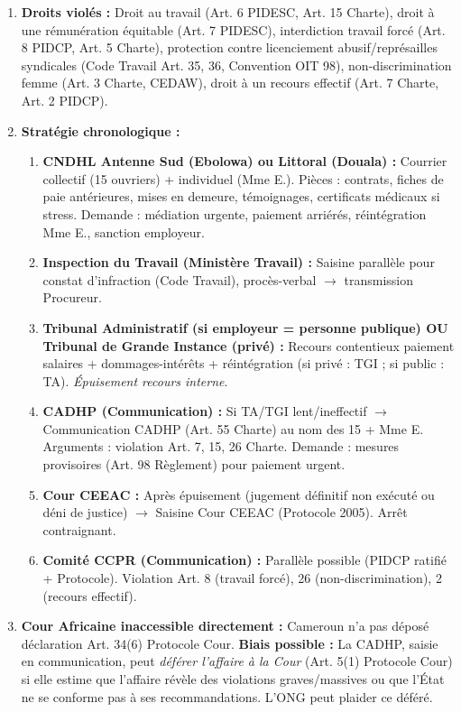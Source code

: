 \documentclass[11pt]{article}
\begin{document}
\begin{corrige}
\begin{enumerate}
  \item \textbf{Droits violés :} Droit au travail (Art. 6 PIDESC, Art. 15 Charte), droit à une rémunération équitable (Art. 7 PIDESC), interdiction travail forcé (Art. 8 PIDCP, Art. 5 Charte), protection contre licenciement abusif/représailles syndicales (Code Travail Art. 35, 36, Convention OIT 98), non-discrimination femme (Art. 3 Charte, CEDAW), droit à un recours effectif (Art. 7 Charte, Art. 2 PIDCP).
  \item \textbf{Stratégie chronologique :}
    \begin{enumerate}
      \item \textbf{CNDHL Antenne Sud (Ebolowa) ou Littoral (Douala) :} Courrier collectif (15 ouvriers) + individuel (Mme E.). Pièces : contrats, fiches de paie antérieures, mises en demeure, témoignages, certificats médicaux si stress. Demande : médiation urgente, paiement arriérés, réintégration Mme E., sanction employeur.
      \item \textbf{Inspection du Travail (Ministère Travail) :} Saisine parallèle pour constat d'infraction (Code Travail), procès-verbal $\to$ transmission Procureur.
      \item \textbf{Tribunal Administratif (si employeur = personne publique) OU Tribunal de Grande Instance (privé) :} Recours contentieux paiement salaires + dommages-intérêts + réintégration (si privé : TGI ; si public : TA). \emph{Épuisement recours interne}.
      \item \textbf{CADHP (Communication) :} Si TA/TGI lent/ineffectif $\to$ Communication CADHP (Art. 55 Charte) au nom des 15 + Mme E. Arguments : violation Art. 7, 15, 26 Charte. Demande : mesures provisoires (Art. 98 Règlement) pour paiement urgent.
      \item \textbf{Cour CEEAC :} Après épuisement (jugement définitif non exécuté ou déni de justice) $\to$ Saisine Cour CEEAC (Protocole 2005). Arrêt contraignant.
      \item \textbf{Comité CCPR (Communication) :} Parallèle possible (PIDCP ratifié + Protocole). Violation Art. 8 (travail forcé), 26 (non-discrimination), 2 (recours effectif).
    \end{enumerate}
  \item \textbf{Cour Africaine inaccessible directement :} Cameroun n'a pas déposé déclaration Art. 34(6) Protocole Cour. \textbf{Biais possible :} La CADHP, saisie en communication, peut \emph{déférer l'affaire à la Cour} (Art. 5(1) Protocole Cour) si elle estime que l'affaire révèle des violations graves/massives ou que l'État ne se conforme pas à ses recommandations. L'ONG peut plaider ce déféré.

\end{enumerate}
\end{corrige}
\end{document}

